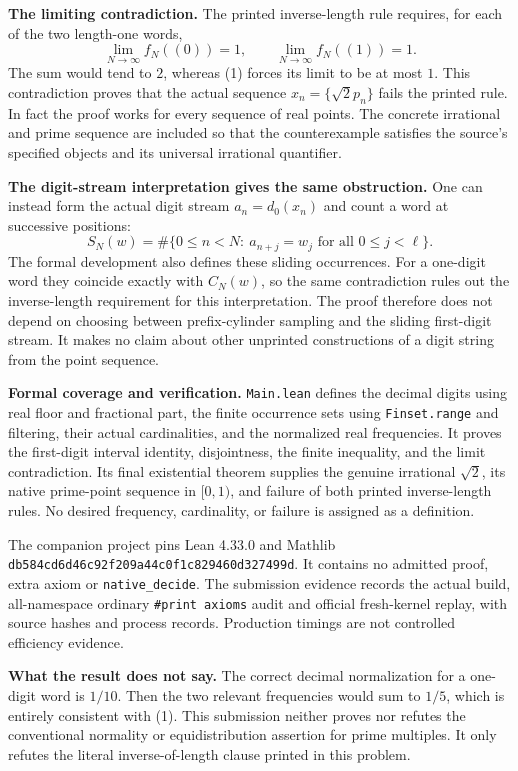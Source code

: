 \documentclass[10pt,a4paper]{article}
\begin{document}
\newpage
\textbf{The limiting contradiction.}
The printed inverse-length rule requires, for each of the two length-one words,
\[
 \lim_{N\to\infty} f_N((0))=1,
 \qquad \lim_{N\to\infty} f_N((1))=1.
\]
The sum would tend to $2$, whereas (1) forces its limit to be at most $1$.
This contradiction proves that the actual sequence $x_n=\{\sqrt2 p_n\}$ fails
the printed rule. In fact the proof works for every sequence of real points.
The concrete irrational and prime sequence are included so that the counterexample
satisfies the source's specified objects and its universal irrational quantifier.

\textbf{The digit-stream interpretation gives the same obstruction.}
One can instead form the actual digit stream $a_n=d_0(x_n)$ and count a word at
successive positions:
\[
 S_N(w)=\#\{0\le n<N:\ a_{n+j}=w_j\text{ for all }0\le j<\ell\}.
\]
The formal development also defines these sliding occurrences. For a one-digit
word they coincide exactly with $C_N(w)$, so the same contradiction rules out
the inverse-length requirement for this interpretation. The proof therefore
does not depend on choosing between prefix-cylinder sampling and the sliding
first-digit stream. It makes no claim about other unprinted constructions
of a digit string from the point sequence.

\textbf{Formal coverage and verification.}
\texttt{Main.lean} defines the decimal digits using real floor and fractional part,
the finite occurrence sets using \texttt{Finset.range} and filtering, their actual
cardinalities, and the normalized real frequencies. It proves the first-digit
interval identity, disjointness, the finite inequality, and the limit contradiction.
Its final existential theorem supplies the genuine irrational $\sqrt2$, its native
prime-point sequence in $[0,1)$, and failure of both printed inverse-length rules.
No desired frequency, cardinality, or failure is assigned as a definition.

The companion project pins Lean 4.33.0 and Mathlib
\texttt{db584cd6d46c92f209a44c0f1c829460d327499d}.
It contains no admitted proof, extra axiom or \texttt{native\_decide}.
The submission evidence records the actual build, all-namespace ordinary
\texttt{\#print axioms} audit and official fresh-kernel replay, with source hashes
and process records. Production timings are not controlled efficiency evidence.

\textbf{What the result does not say.}
The correct decimal normalization for a one-digit word is $1/10$.
Then the two relevant frequencies would sum to $1/5$, which is entirely
consistent with (1). This submission neither proves nor refutes the conventional
normality or equidistribution assertion for prime multiples. It only refutes
the literal inverse-of-length clause printed in this problem.
\end{document}
